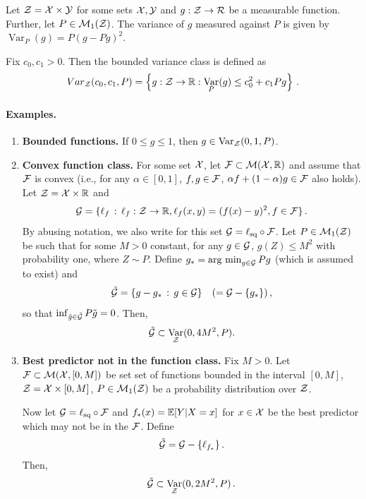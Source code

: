 \documentclass[twoside]{article}
\newcommand{\set}[1]{\left\{#1\right\}}
\DeclareMathOperator{\Var}{Var}
\begin{document}
Let $\mathcal{Z} = \mathcal{X} \times \mathcal{Y}$ for some sets $\mathcal{X}, \mathcal{Y}$ and $g:\mathcal{Z} \to \mathcal{R}$ be a measurable function. Further, let $P \in \mathcal{M}_1(\mathcal{Z})$. The variance of $g$ measured against $P$ is given by $\Var_P(g) = P(g-Pg)^2$.

\begin{definition}
    Fix $c_0, c_1 > 0$. Then the bounded variance class is defined as
    \[
        Var_{\cZ}(c_0, c_1, P) = \set{g: \cZ \to \R : \Var_P(g) \le c_0^2 + c_1Pg } \,.
    \]
\end{definition}

\paragraph{Examples.}
\begin{enumerate}
    \item \textbf{Bounded functions.} If $0 \le g \le 1$, then $g \in \Var_{\cZ}(0, 1, P)$.

    \item \textbf{Convex function class. }
    For some set $\mathcal{X}$, let $\mathcal{F} \subset \mathcal{M}(\mathcal{X},\mathbb{R})$ and assume that $\mathcal{F}$ is convex (i.e., for any $\alpha\in [0,1]$, $f,g\in \mathcal{F}$, $\alpha f + (1-\alpha)g \in \mathcal{F}$ also holds).
    Let $\mathcal{Z} = \mathcal{X} \times \mathbb{R}$ and 
    \[
        \mathcal{G} = \{ \ell_f \,:\, \ell_f: \mathcal{Z} \to \mathbb{R}, \ell_f(x,y) = (f(x)-y)^2, f\in \mathcal{F} \}\,.
    \]
    By abusing notation, we also write for this set  $\mathcal{G} = \ell_{\text{sq}}\circ \mathcal{F}$.
    Let $P\in \mathcal{M}_1(\mathcal{Z})$ be such that
    for some $M>0$ constant, for any $g\in \mathcal{G}$, $g(Z)\le M^2$ with probability one, where $Z\sim P$.
    Define $g_* = \operatorname*{arg\ min}_{g\in \mathcal{G}} P g$ (which is assumed to exist) and 
    \begin{align*}
    \tilde{\mathcal{G}} = \{ g - g_* \,:\, g\in \mathcal{G} \}  \quad (= \mathcal{G} - \{ g_*\})\,,
    \end{align*}
    so that $\inf_{\tilde{g} \in \tilde{\mathcal{G}}} P\tilde{g} = 0$. Then, 
    \begin{align*}
    \tilde \cG \subset \Var_{\cZ}(0, 4M^2,P).
    \end{align*}

    \item \textbf{Best predictor not in the function class. }
    Fix $M>0$. Let $\mathcal{F} \subset \mathcal{M}(\mathcal{X},[0,M])$ be set set of functions bounded in the interval $[0,M]$, $\mathcal{Z} = \mathcal{X} \times [0,M]$, $P\in \mathcal{M}_1(\mathcal{Z})$ be a probability distribution over $\mathcal{Z}$.
    
    Now let $\mathcal{G} = \ell_{\text{sq}} \circ \mathcal{F}$ and $f_*(x) = \mathbb{E}[Y|X=x]$ for $x\in \mathcal{X}$ be the best predictor which may not be in the $\mathcal{F}$. Define
    \[
        \tilde {\mathcal{G}} = \mathcal{G} - \{ \ell_{f_*} \}\,.
    \]
    Then,
    \[
        \tilde \cG \subset \Var_{\cZ}(0, 2M^2,P) \,.
    \]  
\end{enumerate}

 
\end{document}
